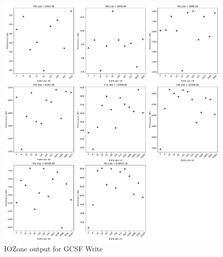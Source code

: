 \begin{figure}[!htb]
	\label{fig:bench_gcsf_write}
	\begin{center}
		\includegraphics[width=1.0\textwidth]{figures/benchmarking/gcsf/Write.pdf}
	\end{center}
	\caption{IOZone output for GCSF Write}
\end{figure}


